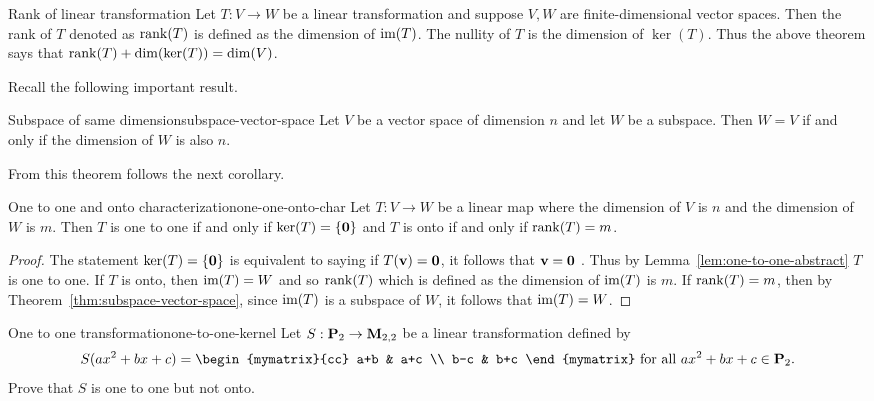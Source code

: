 \begin{definition}{Rank of linear transformation}{}
Let $T:V\rightarrow W$ be a linear transformation and suppose $V,W$ are finite-dimensional vector spaces. Then
the rank of $T$ denoted as $\rank(T) $ is defined as the
dimension of $\mbox{\rm im}(T)$. The nullity of $T$ is the
dimension of $\ker (T)$. Thus the above theorem says that $
\rank(T) +\dim (\ker (T)) =\dim
(V)$.
\end{definition}

Recall the following important result.

\begin{theorem}{Subspace of same dimension}{subspace-vector-space}
Let $V$ be a vector space of dimension $n$ and let $W$ be a
subspace. Then $W=V$ if and only if the dimension of $W$ is also $n$.
\end{theorem}

From this theorem follows the next corollary.

\begin{corollary}{One to one and onto characterization}{one-one-onto-char}
Let $T:V\rightarrow W$ be a linear map where the dimension of $V$ is $n$ and
the dimension of $W$ is $m$. Then $T$ is one to one if and only if $\ker
(T) =\left\{\mbox{\bf 0}\right\} $ and $T$ is onto if and only if $
\rank(T) =m$.
\end{corollary}

\begin{proof}
The statement $\ker (T) =\left\{\mbox{\bf 0}\right\} $
is equivalent to saying if $T (\mbox{\bf v})=\mbox{\bf 0}$, it follows that $\mbox{\bf v}=\mbox{\bf 0}$
. Thus by Lemma~\ref{lem:one-to-one-abstract} $T$ is one to one. If $T$ is onto, then $
\mbox{\rm im}(T) =W$ and so $\rank(T) $ which is
defined as the dimension of $\mbox{\rm im}(T) $ is $m$. If $\rank(T) =m$, then by Theorem~\ref{thm:subspace-vector-space}, since $\mbox{\rm im}
(T) $ is a subspace of $W$, it follows that $\mbox{\rm im}(
T) =W$.
\end{proof}

\begin{example}{One to one transformation}{one-to-one-kernel}
Let $S:\mathbf{P}_2\to\mathbf{M}_{2,2}$ be a linear transformation
defined by
\[ S(ax^2+bx+c)
=
\begin{mymatrix}{cc}
a+b & a+c \\ b-c & b+c \end{mymatrix}
\mbox{ for all }
 ax^2+bx+c\in \Poly_2.\]
Prove that $S$ is one to one but not onto.
\end{example}

